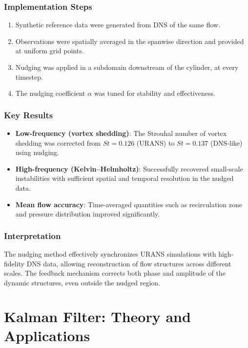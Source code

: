 \documentclass[a4paper]{article}
\begin{document}
\subsubsection*{Implementation Steps}

\begin{enumerate}
  \item Synthetic reference data were generated from DNS of the same flow.
  \item Observations were spatially averaged in the spanwise direction and provided at uniform grid points.
  \item Nudging was applied in a subdomain downstream of the cylinder, at every timestep.
  \item The nudging coefficient $\alpha$ was tuned for stability and effectiveness.
\end{enumerate}

\subsubsection*{Key Results}

\begin{itemize}
  \item \textbf{Low-frequency (vortex shedding)}: The Strouhal number of vortex shedding was corrected from $St = 0.126$ (URANS) to $St = 0.137$ (DNS-like) using nudging.
  \item \textbf{High-frequency (Kelvin–Helmholtz)}: Successfully recovered small-scale instabilities with sufficient spatial and temporal resolution in the nudged data.
  \item \textbf{Mean flow accuracy}: Time-averaged quantities such as recirculation zone and pressure distribution improved significantly.
\end{itemize}

\subsubsection*{Interpretation}

The nudging method effectively synchronizes URANS simulations with high-fidelity DNS data, allowing reconstruction of flow structures across different scales. The feedback mechanism corrects both phase and amplitude of the dynamic structures, even outside the nudged region.



\section{Kalman Filter: Theory and Applications}
\end{document}
